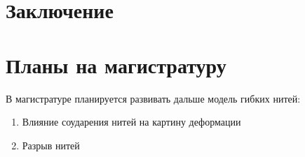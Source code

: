 \section{Заключение}\label{ch:conclusion}


\section*{Планы на магистратуру}
В магистратуре планируется развивать дальше модель гибких нитей:

\begin{enumerate}
    \item Влияние соударения нитей на картину деформации
    \item Разрыв нитей
\end{enumerate}
